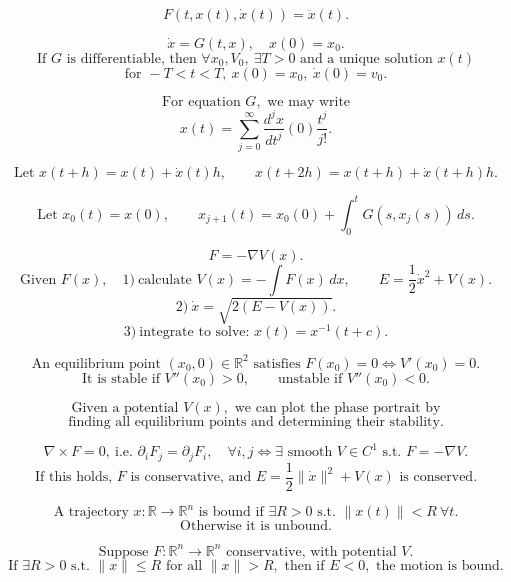 \documentclass[11pt]{article}
\begin{document}


\[
F(t,x(t),\dot x(t))=\ddot x(t).
\]

\[
\dot x=G(t,x),\quad x(0)=x_0.
\]
\[
\text{If }G\text{ is differentiable, then }\forall x_0,V_0,\ \exists T>0
\text{ and a unique solution }x(t)
\]
\[
\text{for }-T<t<T,\ x(0)=x_0,\ \dot x(0)=v_0.
\]

\[
\text{For equation }G,\text{ we may write}
\]
\[
x(t)=\sum_{j=0}^{\infty}\frac{d^jx}{dt^j}(0)\frac{t^j}{j!}.
\]

\[
\text{Let }x(t+h)=x(t)+\dot x(t)h,\qquad
x(t+2h)=x(t+h)+\dot x(t+h)h.
\]

\[
\text{Let }x_0(t)=x(0),\qquad
x_{j+1}(t)=x_0(0)+\int_0^t G(s,x_j(s))\,ds.
\]

\[
F=-\nabla V(x).
\]
\[
\text{Given }F(x),\quad
1)\ \text{calculate }V(x)=-\int F(x)\,dx,
\qquad
E=\frac12\dot x^2+V(x).
\]
\[
2)\ \dot x=\sqrt{2(E-V(x))}.
\]
\[
3)\ \text{integrate to solve: }x(t)=x^{-1}(t+c).
\]

\[
\text{An equilibrium point }(x_0,0)\in\mathbb R^2\text{ satisfies }F(x_0)=0
\Longleftrightarrow V'(x_0)=0.
\]
\[
\text{It is stable if }V''(x_0)>0,\qquad
\text{unstable if }V''(x_0)<0.
\]

\[
\text{Given a potential }V(x),\text{ we can plot the phase portrait by}
\]
\[
\text{finding all equilibrium points and determining their stability.}
\]

\[
\nabla\times F=0,\ \text{i.e. } \partial_iF_j=\partial_jF_i,\quad
\forall i,j
\Longleftrightarrow
\exists\text{ smooth }V\in C^1\text{ s.t. }F=-\nabla V.
\]
\[
\text{If this holds, }F\text{ is conservative, and }
E=\frac12\|\dot x\|^2+V(x)\text{ is conserved.}
\]

\[
\text{A trajectory }x:\mathbb R\to\mathbb R^n
\text{ is bound if }\exists R>0
\text{ s.t. }\|x(t)\|<R\ \forall t.
\]
\[
\text{Otherwise it is unbound.}
\]

\[
\text{Suppose }F:\mathbb R^n\to\mathbb R^n\text{ conservative, with potential }V.
\]
\[
\text{If }\exists R>0\text{ s.t. }\|x\|\le R\text{ for all }\|x\|>R,
\text{ then if }E<0,\text{ the motion is bound.}
\]
\end{document}

